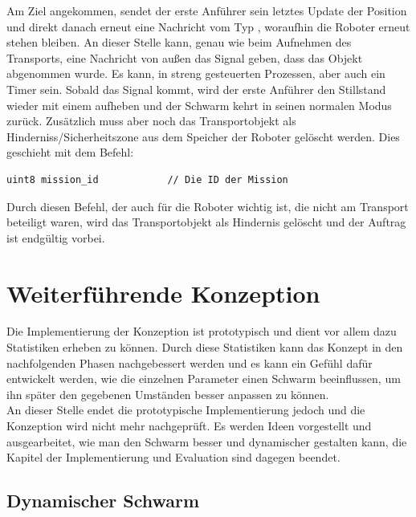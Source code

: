 Am Ziel angekommen, sendet der erste Anführer sein letztes Update der Position und direkt danach erneut eine Nachricht vom Typ , woraufhin die Roboter erneut stehen bleiben. An dieser Stelle kann, genau wie beim Aufnehmen des Transports, eine Nachricht von außen das Signal geben, dass das Objekt abgenommen wurde. Es kann, in streng gesteuerten Prozessen, aber auch ein Timer sein. Sobald das Signal kommt, wird der erste Anführer den Stillstand wieder mit einem  aufheben und der Schwarm kehrt in seinen normalen Modus zurück. Zusätzlich muss aber noch das Transportobjekt als Hinderniss/Sicherheitszone aus dem Speicher der Roboter gelöscht werden. Dies geschieht mit dem Befehl:

\begin{lstlisting}[style=ros, title=Nachrichten-Typ: Delete\_Object.msg]
uint8 mission_id			// Die ID der Mission
\end{lstlisting}

Durch diesen Befehl, der auch für die Roboter wichtig ist, die nicht am Transport beteiligt waren, wird das Transportobjekt als Hindernis gelöscht und der Auftrag ist endgültig vorbei.












\section{Weiterführende Konzeption}

Die Implementierung der Konzeption ist prototypisch und dient vor allem dazu Statistiken erheben zu können. Durch diese Statistiken kann das Konzept in den nachfolgenden Phasen nachgebessert werden und es kann ein Gefühl dafür entwickelt werden, wie die einzelnen Parameter einen Schwarm beeinflussen, um ihn später den gegebenen Umständen besser anpassen zu können.\\

An dieser Stelle endet die prototypische Implementierung jedoch und die Konzeption wird nicht mehr nachgeprüft. Es werden Ideen vorgestellt und ausgearbeitet, wie man den Schwarm besser und dynamischer gestalten kann, die Kapitel der Implementierung und Evaluation sind dagegen beendet.

\subsection{Dynamischer Schwarm}

